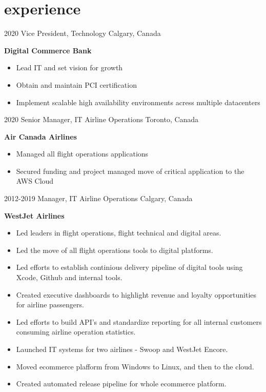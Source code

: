 \section{experience}

\begin{entrylist}
  \entry
    {2020}
    {Vice President, Technology}
    {Calgary, Canada}
    {
      \textbf{Digital Commerce Bank}
      \begin{itemize}
        \item Lead IT and set vision for growth
	\item Obtain and maintain PCI certification
	\item Implement scalable high availability environments acress multiple datacenters
      \end{itemize}
    }
  \entry
    {2020}
    {Senior Manager, IT Airline Operations}
    {Toronto, Canada}
    {
      \textbf{Air Canada Airlines}
      \begin{itemize}
        \item Managed all flight operations applications 
	\item Secured funding and project managed move of critical application to the AWS Cloud 
      \end{itemize}
    }
  \entry
    {2012-2019}
    {Manager, IT Airline Operations}
    {Calgary, Canada}
    {
      \textbf{WestJet Airlines}
      \begin{itemize}
        \item Led leaders in flight operations, flight technical and digital areas. 
        \item Led the move of all flight operations tools to digital platforms.
        \item Led efforts to establish continious delivery pipeline of digital tools using Xcode, Github and internal tools. 
        \item Created executive dashboards to highlight revenue and loyalty opportunities for airline passengers.  
        \item Led efforts to build API's and standardize reporting for all internal customers consuming airline operation statistics. 
        \item Launched IT systems for two airlines - Swoop and WestJet Encore.
        \item Moved ecommerce plafform from Windows to Linux, and then to the cloud.
        \item Created automated release pipeline for whole ecommerce platform. 

\end{itemize}}
\end{entrylist}
